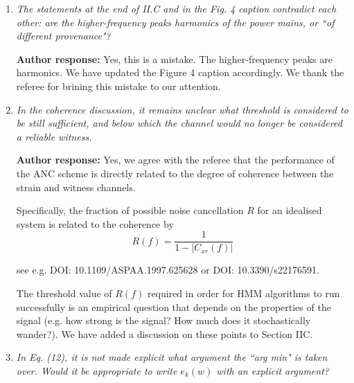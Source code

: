 \documentclass[10pt]{article}
\begin{document}
\begin{enumerate}
				\textbf{Author response:}  \newline 
	Yes, we agree that is is desirable to provide a more permanent reference to the PEM channels. However, unfortunately at this point in time there is no DOI /DCC reference that covers all nine PEM channels. It is possible to reference the GWOSC O3 auxiliary channel data release, DOI: 10.7935/3bh6-0k98. Note that this dataset only contains a subset (three) of the (nine) PEM channels. For lack of a better option, we have followed the referee's suggestion and included this DOI as an additional reference. 

	\item \textit{The statements at the end of II.C and in the Fig. 4 caption contradict each  
		other: are the higher-frequency peaks harmonics of the power mains, or ``of  
		different provenance"?}
	
				\textbf{Author response:}  \newline 
	Yes, this is a mistake. The higher-frequency peaks are harmonics. We have updated the Figure 4 caption accordingly. We thank the referee for brining this mistake to our attention.
	
	\item \textit{In the coherence discussion, it remains unclear what threshold is considered  to be still sufficient, and below which the channel would no longer be considered a reliable witness.}
	
				\textbf{Author response:}  \newline 
	Yes, we agree with the referee that the performance of the ANC scheme is directly related to the degree of coherence between the strain and witness channels. 
	
	Specifically, the fraction of possible noise cancellation $R$ for an idealised system is related to the coherence by
	$$ R(f) = \frac{1}{1 - |C_{xr}(f)|}$$ 
	
	see e.g. DOI: 10.1109/ASPAA.1997.625628 or DOI: 10.3390/s22176591.
	
	The threshold value of $R(f)$ required in order for HMM algorithms to run successfully is an empirical question that depends on the properties of the signal (e.g. how strong is the signal? How much does it stochastically wander?). We have added a discussion on these points to Section IIC.
	

	\item \textit{In Eq. (12), it is not made explicit what argument the ``arg min" is taken  
		over. Would it be appropriate to write $e_k(w)$ with an explicit argument?}
	

\end{enumerate}
\end{document}
